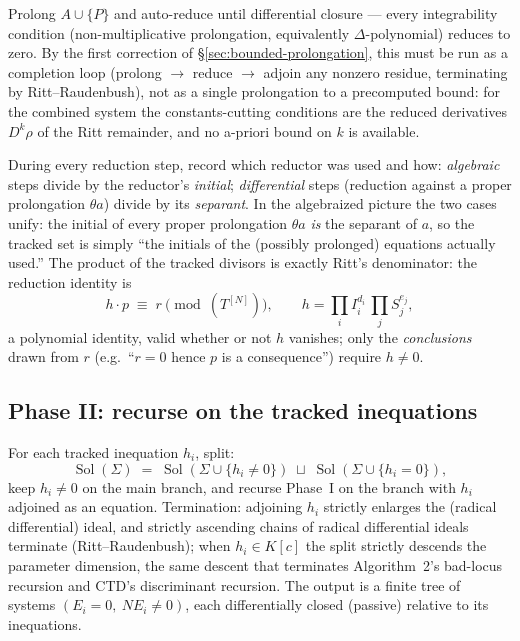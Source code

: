 \documentclass[11pt]{article}
\DeclareMathOperator{\Sol}{Sol}
\begin{document}
Prolong $A\cup\{P\}$ and auto-reduce until differential closure --- every
integrability condition (non-multiplicative prolongation, equivalently
$\Delta$-polynomial) reduces to zero. By the first correction of
\S\ref{sec:bounded-prolongation}, this must be run as a completion loop
(prolong $\to$ reduce $\to$ adjoin any nonzero residue, terminating by
Ritt--Raudenbush), not as a single prolongation to a precomputed bound: for
the combined system the constants-cutting conditions are the reduced
derivatives $D^k\rho$ of the Ritt remainder, and no a-priori bound on $k$ is
available.

During every reduction step, record which reductor was used and how:
\emph{algebraic} steps divide by the reductor's \emph{initial};
\emph{differential} steps (reduction against a proper prolongation
$\theta a$) divide by its \emph{separant}. In the algebraized picture the two
cases unify: the initial of every proper prolongation $\theta a$ \emph{is}
the separant of $a$, so the tracked set is simply ``the initials of the
(possibly prolonged) equations actually used.'' The product of the tracked
divisors is exactly Ritt's denominator: the reduction identity is
\begin{equation}
\label{eq:reduction-identity}
h \cdot p \;\equiv\; r \pmod{(T^{[N]})},
\qquad h = \prod_i I_i^{d_i}\,\prod_j S_j^{e_j},
\end{equation}
a polynomial identity, valid whether or not $h$ vanishes; only the
\emph{conclusions} drawn from $r$ (e.g.\ ``$r=0$ hence $p$ is a consequence'')
require $h \ne 0$.

\subsection{Phase II: recurse on the tracked inequations}

For each tracked inequation $h_i$, split:
\[
\Sol(\Sigma) \;=\; \Sol(\Sigma \cup \{h_i \ne 0\})
   \;\sqcup\; \Sol(\Sigma \cup \{h_i = 0\}),
\]
keep $h_i \ne 0$ on the main branch, and recurse Phase~I on the branch with
$h_i$ adjoined as an equation. Termination: adjoining $h_i$ strictly enlarges
the (radical differential) ideal, and strictly ascending chains of radical
differential ideals terminate (Ritt--Raudenbush); when $h_i \in K[c]$ the
split strictly descends the parameter dimension, the same descent that
terminates Algorithm~2's bad-locus recursion and CTD's discriminant recursion.
The output is a finite tree of systems $(E_i = 0,\ NE_i \ne 0)$, each
differentially closed (passive) relative to its inequations.
\end{document}
